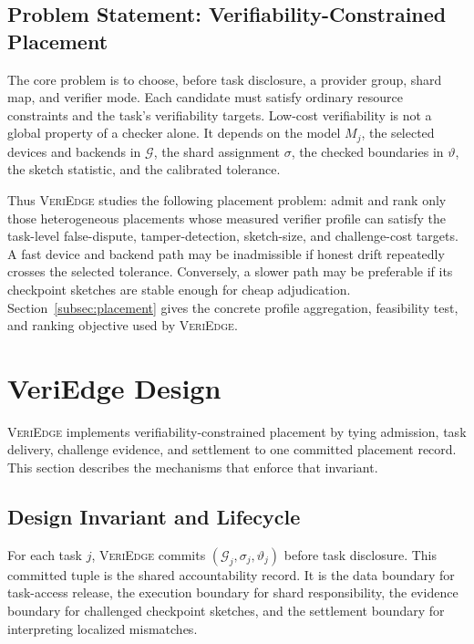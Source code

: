 \documentclass[sigplan,screen,review,anonymous]{acmart}
\newcommand{\system}{\textsc{VeriEdge}\xspace}
\begin{document}
\subsection{Problem Statement: Verifiability-Constrained Placement}
\label{subsec:verifiability-model}

The core problem is to choose, before task disclosure, a provider group,
shard map, and verifier mode. Each candidate must satisfy ordinary resource
constraints and the task's verifiability targets. Low-cost verifiability is
not a global property of a
checker alone. It depends on the model \(M_j\), the selected devices and
backends in \(\mathcal{G}\), the shard assignment \(\sigma\), the checked
boundaries in \(\vartheta\), the sketch statistic, and the calibrated
tolerance.

Thus \system studies the following placement problem: admit and rank only
those heterogeneous placements whose measured verifier profile can satisfy
the task-level false-dispute, tamper-detection, sketch-size, and
challenge-cost targets. A fast device and backend path may be inadmissible if
honest drift repeatedly crosses the selected tolerance. Conversely, a slower
path may be preferable if its checkpoint sketches are stable enough for
cheap adjudication. Section~\ref{subsec:placement} gives the concrete
profile aggregation, feasibility test, and ranking objective used by
\system.




\section{VeriEdge Design}
\label{sec:design}
\label{sec:overview}
\label{sec:orchestration}

\system implements verifiability-constrained placement by tying admission,
task delivery, challenge evidence, and settlement to one committed placement
record. This section describes the mechanisms that enforce that invariant.

\subsection{Design Invariant and Lifecycle}
\label{subsec:overview-invariant}
\label{subsec:control-loop}

For each task \(j\), \system commits
\((\mathcal{G}_j,\sigma_j,\vartheta_j)\) before task disclosure. This
committed tuple is the shared accountability record. It is the data boundary
for task-access release, the execution boundary for shard responsibility,
the evidence boundary for challenged checkpoint sketches, and the settlement
boundary for interpreting localized mismatches.
\end{document}
